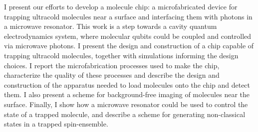 I present our efforts to develop a molecule chip: a microfabricated device for
trapping ultracold molecules near a surface and interfacing them with photons
in a microwave resonator. This work is a step towards a cavity quantum
electrodynamics system, where molecular qubits could be coupled and controlled
via microwave photons.
%
I present the design and construction of a chip capable of trapping ultracold
molecules, together with simulations informing the design choices. I report
the microfabrication processes used to make the chip, characterize the quality
of these processes and describe the design and construction of the apparatus
needed to load molecules onto the chip and detect them.
%
I also present a scheme for background-free imaging of molecules near the
surface.  Finally, I show how a microwave resonator could be used to control
the state of a trapped molecule, and describe a scheme for generating
non-classical states in a trapped spin-ensemble.
